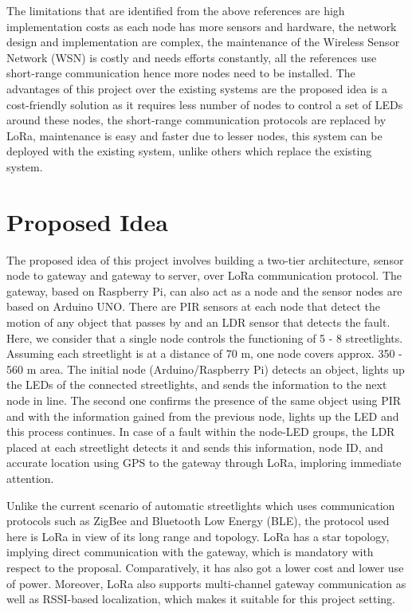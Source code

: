 \documentclass[11pt, oneside]{article}   	%
\begin{document}
The limitations that are identified from the above references are high implementation costs as each node has more sensors and hardware, the network design and implementation are complex, the 
maintenance of the Wireless Sensor Network (WSN) is costly and needs efforts constantly, all the references use short-range communication hence more nodes need to be installed. The advantages of 
this project over the existing systems are the proposed idea is a cost-friendly solution as it requires less number of nodes to control a set of LEDs around these nodes, the short-range communication 
protocols are replaced by LoRa, maintenance is easy and faster due to lesser nodes, this system can be deployed with the existing system, unlike others which replace the existing system.



\section{Proposed Idea}

The proposed idea of this project involves building a two-tier architecture, sensor node to gateway and gateway to server, over LoRa communication protocol. The gateway, based on Raspberry Pi, can also act as a node and the sensor nodes are based on Arduino UNO. There are PIR sensors at each node that detect the motion of any object that passes by and an LDR sensor that detects the fault. Here, we consider that a single node controls the functioning of 5 - 8 streetlights. Assuming each streetlight is at a distance of 70 m, one node covers approx. 350 - 560 m area. The initial node (Arduino/Raspberry Pi) detects an object, lights up the LEDs of the connected streetlights, and sends the information to the next node in line. The second one confirms the presence of the same object using PIR and with the information gained from the previous node, lights up the LED and this process continues. In case of a fault within the node-LED groups, the LDR placed at each streetlight detects it and sends this information, node ID, and accurate location using GPS to the gateway through LoRa, imploring immediate attention. 

Unlike the current scenario of automatic streetlights which uses communication protocols such as ZigBee and Bluetooth Low Energy (BLE), the protocol used here is LoRa in view of its long range and topology. LoRa has a star topology, implying direct communication with the gateway, which is mandatory with respect to the proposal. Comparatively, it has also got a lower cost and lower use of power. Moreover, LoRa also supports multi-channel gateway communication as well as RSSI-based localization, which makes it suitable for this project setting.
\end{document}
